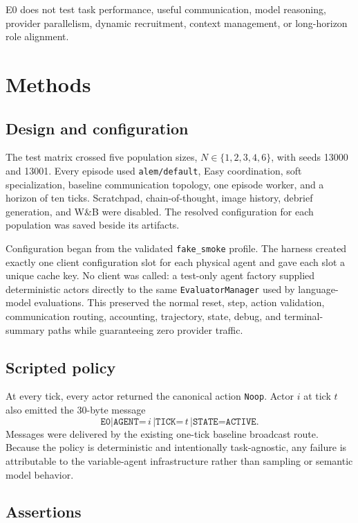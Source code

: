 \documentclass[11pt]{article}
\newcommand{\code}[1]{\texttt{#1}}
\begin{document}
E0 does not test task performance, useful communication, model reasoning,
provider parallelism, dynamic recruitment, context management, or long-horizon
role alignment.

\section{Methods}

\subsection{Design and configuration}

The test matrix crossed five population sizes,
$N\in\{1,2,3,4,6\}$, with seeds 13000 and 13001.  Every episode used
\code{alem/default}, Easy coordination, soft specialization, baseline
communication topology, one episode worker, and a horizon of ten ticks.
Scratchpad, chain-of-thought, image history, debrief generation, and W\&B were
disabled.  The resolved configuration for each population was saved beside its
artifacts.

Configuration began from the validated \code{fake\_smoke} profile.  The harness
created exactly one client configuration slot for each physical agent and gave
each slot a unique cache key.  No client was called: a test-only agent factory
supplied deterministic actors directly to the same \code{EvaluatorManager} used
by language-model evaluations.  This preserved the normal reset, step, action
validation, communication routing, accounting, trajectory, state, debug, and
terminal-summary paths while guaranteeing zero provider traffic.

\subsection{Scripted policy}

At every tick, every actor returned the canonical action \code{Noop}.  Actor $i$
at tick $t$ also emitted the 30-byte message
\[
\code{E0|AGENT=}\,i\,\code{|TICK=}\,t\,\code{|STATE=ACTIVE}.
\]
Messages were delivered by the existing one-tick baseline broadcast route.
Because the policy is deterministic and intentionally task-agnostic, any
failure is attributable to the variable-agent infrastructure rather than
sampling or semantic model behavior.

\subsection{Assertions}
\end{document}
